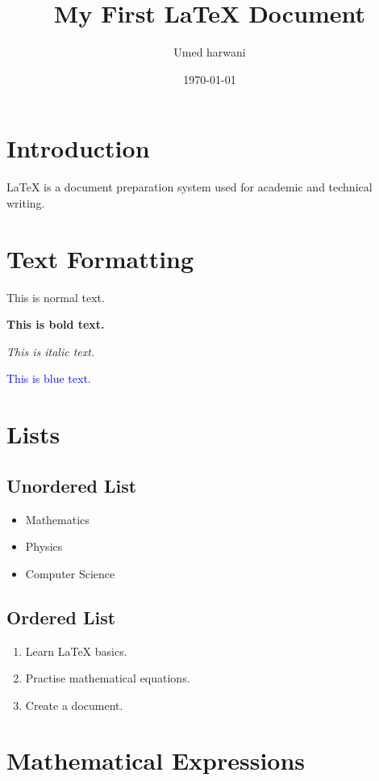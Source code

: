 \documentclass[12pt,a4paper]{article}
\title{My First LaTeX Document}
\author{Umed harwani}
\date{\today}
\begin{document}
\maketitle

\section{Introduction}

LaTeX is a document preparation system
used for academic and technical writing.

\section{Text Formatting}

This is normal text.

\textbf{This is bold text.}

\textit{This is italic text.}

\textcolor{blue}{This is blue text.}

\section{Lists}

\subsection{Unordered List}

\begin{itemize}
    \item Mathematics
    \item Physics
    \item Computer Science
\end{itemize}

\subsection{Ordered List}

\begin{enumerate}
    \item Learn LaTeX basics.
    \item Practise mathematical equations.
    \item Create a document.
\end{enumerate}

\section{Mathematical Expressions}
\end{document}
